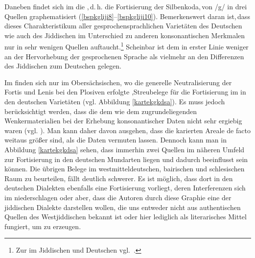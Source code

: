 {{}


Daneben findet sich im  die ,\,d.\,h. die Fortisierung der Silbenkoda,\,von /g/ in drei Quellen graphematisiert (\ref{bspkgliji8}–\ref{bspkgliji10}). Bemerkenswert daran ist,\,dass dieses Charakteristikum aller gesprochensprachlichen Varietäten des Deutschen wie auch des Jiddischen im Unterschied zu anderen konsonantischen Merkmalen nur in sehr wenigen Quellen auftaucht.\footnote{Zur  im Jiddischen und Deutschen vgl.\, \cite[373]{Bin-Nun1973}.} Scheinbar ist dem \hai{{\LiJieins}} in erster Linie weniger an der Hervorhebung der gesprochenen Sprache als vielmehr an den Differenzen des Jiddischen zum Deutschen gelegen.



Im  finden sich nur im Obersächsischen, wo die generelle Neutralisierung der Fortis und Lenis bei den Plosiven erfolgte \parencite[332]{Schirmunski1962},Streubelege für die Fortisierung im  in den deutschen Varietäten (vgl.  Abbildung \ref{kartekgkdsa}). Es muss jedoch berücksichtigt werden, dass die dem  wie dem  zugrundeliegenden Wenkermaterialien bei der Erhebung konsonantischer Daten nicht sehr ergiebig waren (vgl.  \citealt{Bremer1895}). Man kann daher davon ausgehen, dass die karierten Areale de facto weitaus größer sind, als die Daten vermuten lassen. Dennoch kann man in Abbildung \ref{kartekgkdsa} sehen, dass immerhin zwei Quellen im näheren Umfeld zur Fortisierung in den deutschen Mundarten liegen und dadurch beeinflusst sein können. Die übrigen Belege im westmitteldeutschen, bairischen und schlesischen Raum zu beurteilen,  %
fällt deutlich schwerer. Es ist möglich, dass dort in den deutschen Dialekten ebenfalls eine Fortisierung vorliegt, deren Interferenzen sich im \hai{{\LiJieins}} niederschlagen oder aber, dass die Autoren durch diese Graphie eine  der jiddischen Dialekte darstellen wollen, die uns entweder nicht aus authentischen Quellen des Westjiddischen bekannt ist oder hier lediglich als literarisches Mittel fungiert, um  zu erzeugen.

}
